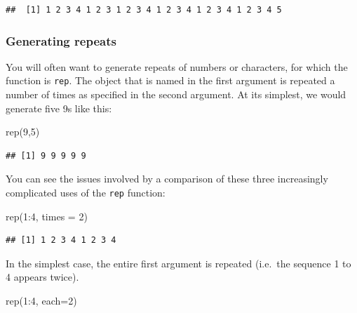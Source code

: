 \documentclass[
]{book}
\newenvironment{Shaded}{\begin{snugshade}}{\end{snugshade}}
\newcommand{\AttributeTok}[1]{\textcolor[rgb]{0.77,0.63,0.00}{#1}}
\newcommand{\DecValTok}[1]{\textcolor[rgb]{0.00,0.00,0.81}{#1}}
\newcommand{\FunctionTok}[1]{\textcolor[rgb]{0.00,0.00,0.00}{#1}}
\newcommand{\NormalTok}[1]{#1}
\newcommand{\SpecialCharTok}[1]{\textcolor[rgb]{0.00,0.00,0.00}{#1}}
\theoremstyle{definition}
\theoremstyle{definition}
\theoremstyle{definition}
\theoremstyle{definition}
\theoremstyle{remark}
\begin{document}
\begin{verbatim}
##  [1] 1 2 3 4 1 2 3 1 2 3 4 1 2 3 4 1 2 3 4 1 2 3 4 5
\end{verbatim}

\hypertarget{generating-repeats}{%
\subsubsection{Generating repeats}\label{generating-repeats}}

You will often want to generate repeats of numbers or characters, for which the function is \texttt{rep}. The object that is named in the first argument is repeated a number of times as specified in the second argument. At its simplest, we would generate five 9s like this:

\begin{Shaded}
\begin{Highlighting}[]
\FunctionTok{rep}\NormalTok{(}\DecValTok{9}\NormalTok{,}\DecValTok{5}\NormalTok{)}
\end{Highlighting}
\end{Shaded}

\begin{verbatim}
## [1] 9 9 9 9 9
\end{verbatim}

You can see the issues involved by a comparison of these three increasingly complicated uses of the \texttt{rep} function:

\begin{Shaded}
\begin{Highlighting}[]
\FunctionTok{rep}\NormalTok{(}\DecValTok{1}\SpecialCharTok{:}\DecValTok{4}\NormalTok{, }\AttributeTok{times =} \DecValTok{2}\NormalTok{)}
\end{Highlighting}
\end{Shaded}

\begin{verbatim}
## [1] 1 2 3 4 1 2 3 4
\end{verbatim}

In the simplest case, the entire first argument is repeated (i.e.~the sequence 1 to 4 appears twice).

\begin{Shaded}
\begin{Highlighting}[]
\FunctionTok{rep}\NormalTok{(}\DecValTok{1}\SpecialCharTok{:}\DecValTok{4}\NormalTok{, }\AttributeTok{each=}\DecValTok{2}\NormalTok{)}
\end{Highlighting}
\end{Shaded}
\end{document}
